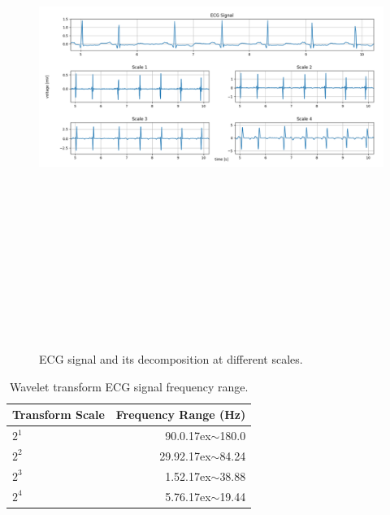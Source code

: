 \begin{figure}[htpb]
	\centering
	\includegraphics[width=14cm,height=17cm,keepaspectratio=true]{images/detail_coefficients}
	\caption{
		ECG signal and its decomposition at different scales.
	}
	\label{fig:detail_coefficients}
\end{figure}

\renewcommand{\arraystretch}{2}
\begin{table}[h]
	\caption{Wavelet transform ECG signal frequency range\cite{shang2014qrs}.} \label{tab:qrsenergy}
	
	\begin{center}
		\begin{tabular}{ | l | r | }
			\hline
			Transform Scale & Frequency Range (Hz) \\ \hline
			${2^1}$  & 90.0{\raise.17ex\hbox{$\scriptstyle\sim$}}180.0 \\ \hline
			${2^2}$  & 29.92{\raise.17ex\hbox{$\scriptstyle\sim$}}84.24  \\ \hline
			${2^3}$  & 1.52{\raise.17ex\hbox{$\scriptstyle\sim$}}38.88  \\ \hline
			${2^4}$  & 5.76{\raise.17ex\hbox{$\scriptstyle\sim$}}19.44  \\ 
			\hline
		\end{tabular}
	\end{center}
	
\end{table}


